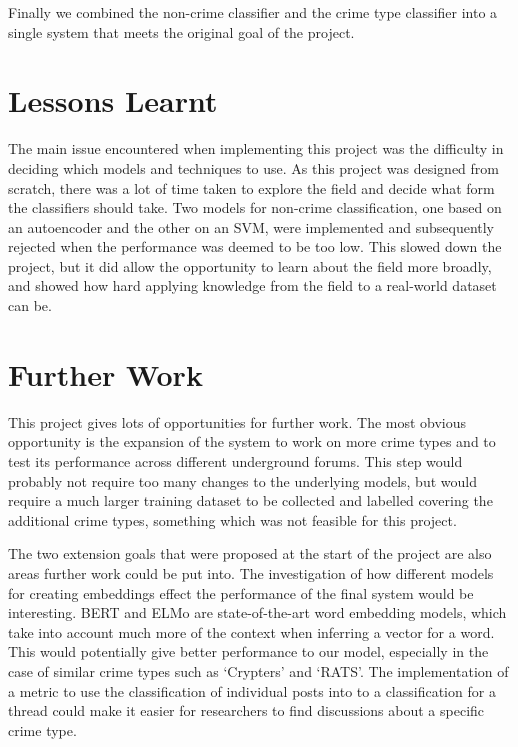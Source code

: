 \documentclass[12pt,a4paper,twoside,openright]{report}
\begin{document}
Finally we combined the non-crime classifier and the crime type classifier into a single system that meets the original goal of the project.

\section{Lessons Learnt}
The main issue encountered when implementing this project was the difficulty in deciding which models and techniques to use. As this project was designed from scratch, there was a lot of time taken to explore the field and decide what form the classifiers should take. Two models for non-crime classification, one based on an autoencoder and the other on an SVM, were implemented and subsequently rejected when the performance was deemed to be too low. This slowed down the project, but it did allow the opportunity to learn about the field more broadly, and showed how hard applying knowledge from the field to a real-world dataset can be.

\section{Further Work}
This project gives lots of opportunities for further work. The most obvious opportunity is the expansion of the system to work on more crime types and to test its performance across different underground forums. This step would probably not require too many changes to the underlying models, but would require a much larger training dataset to be collected and labelled covering the additional crime types, something which was not feasible for this project.
\newline

The two extension goals that were proposed at the start of the project are also areas further work could be put into. The investigation of how different models for creating embeddings effect the performance of the final system would be interesting. BERT and ELMo are state-of-the-art word embedding models, which take into account much more of the context when inferring a vector for a word. This would potentially give better performance to our model, especially in the case of similar crime types such as `Crypters' and `RATS'. The implementation of a metric to use the classification of individual posts into to a classification for a thread could make it easier for researchers to find discussions about a specific crime type.




\end{document}
